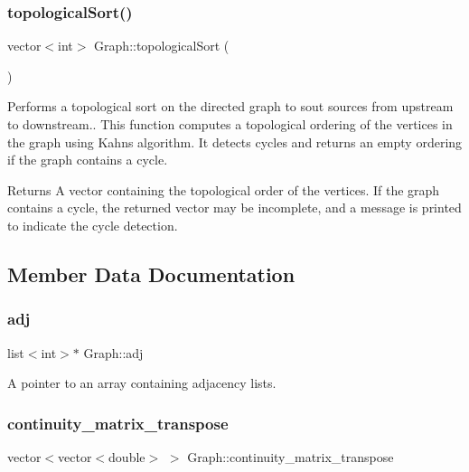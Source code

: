\subsubsection{\texorpdfstring{topological\+Sort()}{topologicalSort()}}
{\footnotesize\ttfamily vector$<$int$>$ Graph\+::topological\+Sort (\begin{DoxyParamCaption}{ }\end{DoxyParamCaption})\hspace{0.3cm}{\ttfamily [protected]}}



Performs a topological sort on the directed graph to sout sources from upstream to downstream.. This function computes a topological ordering of the vertices in the graph using Kahn\textquotesingle{}s algorithm. It detects cycles and returns an empty ordering if the graph contains a cycle. 

\begin{DoxyReturn}{Returns}
A vector containing the topological order of the vertices. If the graph contains a cycle, the returned vector may be incomplete, and a message is printed to indicate the cycle detection. 
\end{DoxyReturn}


\subsection{Member Data Documentation}
\mbox{\label{classGraph_a04ab9c17ad31aa036def8db0f88b035b}} 
\subsubsection{\texorpdfstring{adj}{adj}}
{\footnotesize\ttfamily list$<$int$>$$\ast$ Graph\+::adj\hspace{0.3cm}{\ttfamily [protected]}}



A pointer to an array containing adjacency lists. 

\mbox{\label{classGraph_af903899bcb412f62ec4aa295eef9f45c}} 
\subsubsection{\texorpdfstring{continuity\+\_\+matrix\+\_\+transpose}{continuity\_matrix\_transpose}}
{\footnotesize\ttfamily vector$<$vector$<$double$>$ $>$ Graph\+::continuity\+\_\+matrix\+\_\+transpose\hspace{0.3cm}{\ttfamily [protected]}}



